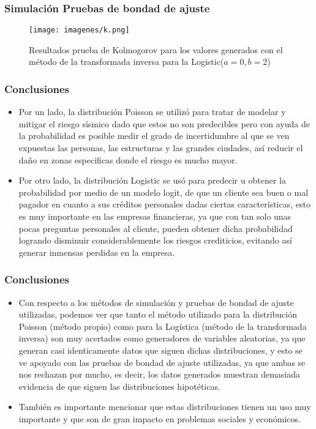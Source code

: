 \documentclass[12pt]{beamer}
\begin{document}
\begin{frame}
\frametitle{Simulación Pruebas de bondad de ajuste}
\begin{figure}
  \centering
  \texttt{[image: imagenes/k.png]}
  \caption{Resultados prueba de Kolmogorov para los valores generados con el método de la transformada inversa para la Logistic($a=0,b=2$)}\label{figura1}
\end{figure}
\end{frame}


\begin{frame}
\frametitle{Conclusiones}
\begin{itemize}
\item Por un lado, la distribución Poisson se utilizó para tratar de modelar y mitigar el riesgo sísmico dado que estos no son predecibles pero con ayuda de la probabilidad es posible medir el grado de incertidumbre al que se ven expuestas las personas, las estructuras y las grandes ciudades, así reducir el daño en zonas especificas donde el riesgo es mucho mayor. 
\item Por otro lado, la distribución Logistic se usó para predecir u obtener la probabilidad por medio de un modelo logit, de que un cliente sea buen o mal pagador en cuanto a sus créditos personales dadas ciertas características, esto es muy importante en las empresas financieras, ya que con tan solo unas pocas preguntas personales al cliente, pueden obtener dicha probabilidad logrando disminuir considerablemente los riesgos crediticios, evitando así generar inmensas perdidas en la empresa.
\end{itemize}
\end{frame}

\begin{frame}
\frametitle{Conclusiones}
\begin{itemize}
\item Con respecto a los métodos de simulación y pruebas de bondad de ajuste utilizadas, podemos ver que tanto el método utilizado para la distribución Poisson (método propio) como para la Logística (método de la transformada inversa) son muy acertados como generadores de variables aleatorias, ya que generan casi identicamente datos que siguen dichas distribuciones, y esto se ve apoyado con las pruebas de bondad de ajuste utilizadas, ya que ambas se nos rechazan por mucho, es decir, los datos generados muestran demasiada evidencia de que siguen las distribuciones hipotéticas.
\item También es importante mencionar que estas distribuciones tienen un uso muy importante y que son de gran impacto en problemas sociales y económicos. 
\end{itemize}
\end{frame}
\end{document}
